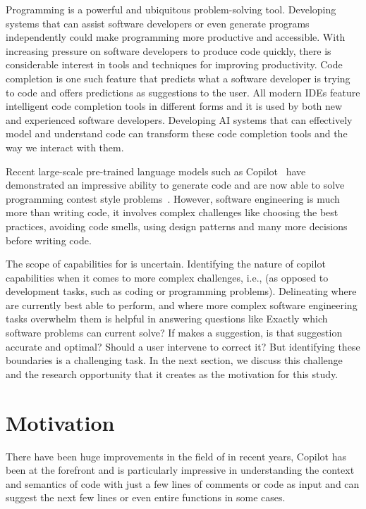 \label{chapter:introduction}
Programming is a powerful and ubiquitous problem-solving tool. Developing systems that can assist software developers or even generate programs independently could make programming more productive and accessible. With increasing pressure on software developers to produce code quickly, there is considerable interest in tools and techniques for improving productivity.
Code completion is one such feature that predicts what a software developer is trying to code and offers predictions as suggestions to the user. All modern IDEs feature intelligent code completion tools in different forms and it is used by both new and experienced software developers. Developing AI systems that can effectively model and understand code can transform these code completion tools and the way we interact with them.

Recent large-scale pre-trained language models such as Copilot~\cite{Copilot-web} have demonstrated an impressive ability to generate code and are now able to solve programming contest style problems~\cite{empirical_eval}. 
However, software engineering is much more than writing code, it involves complex challenges like choosing the best practices, avoiding code smells, using design patterns and many more decisions before writing code. 

The scope of capabilities for \cct{} is uncertain. Identifying the nature of copilot capabilities when it comes to more complex challenges, i.e., \AISE{} (as opposed to development tasks, such as coding or programming problems). Delineating where \cct{} are currently best able to perform, and where more complex software engineering tasks overwhelm them is helpful in answering questions like 
Exactly which software problems can current \cct{} solve? 
If \cct{} makes a suggestion, is that suggestion accurate and optimal? Should a user intervene to correct it? But identifying these boundaries is a challenging task. In the next section, we discuss this challenge and the research opportunity that it creates as the motivation for this study.

\section{Motivation}
There have been huge improvements in the field of \cct{} in recent years, Copilot has been at the forefront and is particularly impressive in understanding the context and semantics of code with just a few lines of comments or code as input and can suggest the next few lines or even entire functions in some cases. 

